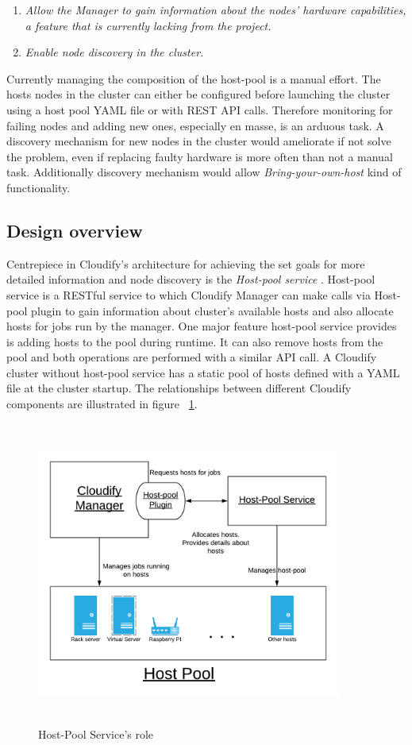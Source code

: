 \begin{enumerate}
\item \textit{Allow the Manager to gain information about the nodes' hardware capabilities, a feature that is currently lacking from the project.}
\item \textit{Enable node discovery in the cluster.}
\end{enumerate}

Currently managing the composition of the host-pool is a manual effort. The hosts nodes in the cluster can either be configured before launching the cluster using a host pool YAML file or with REST API calls. Therefore monitoring for failing nodes and adding new ones, especially en masse, is an arduous task. A discovery mechanism for new nodes in the cluster would ameliorate if not solve the problem, even if replacing faulty hardware is more often than not a manual task. Additionally discovery mechanism would allow \textit{Bring-your-own-host} kind of functionality.

 \subsection{Design overview}
 
 Centrepiece in Cloudify's architecture for achieving the set goals for more detailed information and node discovery is the \textit{Host-pool service} \cite{host-pool-service}. Host-pool service is a RESTful service to which Cloudify Manager can make calls via Host-pool plugin to gain information about cluster's available hosts and also allocate hosts for jobs run by the manager. One major feature host-pool service provides is adding hosts to the pool during runtime. It can also remove hosts from the pool and both operations are performed with a similar API call. A Cloudify cluster without host-pool service has a static pool of hosts defined with a YAML file at the cluster startup. The relationships between different Cloudify components are illustrated in figure ~\ref{fig:cloudify_roles}.
 
 \begin{figure}[ht!]
\centering
  \includegraphics[width=10cm,height=10cm, keepaspectratio]{Cloudify_roles.png}%
  \caption{Host-Pool Service's role}
  \label{fig:cloudify_roles}
\end{figure}

